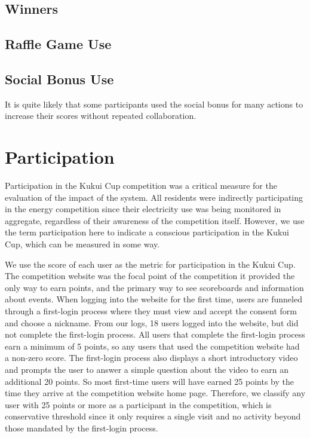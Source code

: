 \subsection{Winners}






\subsection{Raffle Game Use}


\subsection{Social Bonus Use}

It is quite likely that some participants used the social bonus for many actions to increase their scores without repeated collaboration. 


\section{Participation}
\label{sec:participation}

Participation in the Kukui Cup competition was a critical measure for the evaluation of the impact of the system. All residents were indirectly participating in the energy competition since their electricity use was being monitored in aggregate, regardless of their awareness of the competition itself. However, we use the term participation here to indicate a conscious participation in the Kukui Cup, which can be measured in some way.

We use the score of each user as the metric for participation in the Kukui Cup. The competition website was the focal point of the competition it provided the only way to earn points, and the primary way to see scoreboards and information about events. When logging into the website for the first time, users are funneled through a first-login process where they must view and accept the consent form and choose a nickname. From our logs, 18 users logged into the website, but did not complete the first-login process. All users that complete the first-login process earn a minimum of 5 points, so any users that used the competition website had a non-zero score. The first-login process also displays a short introductory video and prompts the user to answer a simple question about the video to earn an additional 20 points. So most first-time users will have earned 25 points by the time they arrive at the competition website home page. Therefore, we classify any user with 25 points or more as a participant in the competition, which is conservative threshold since it only requires a single visit and no activity beyond those mandated by the first-login process.

